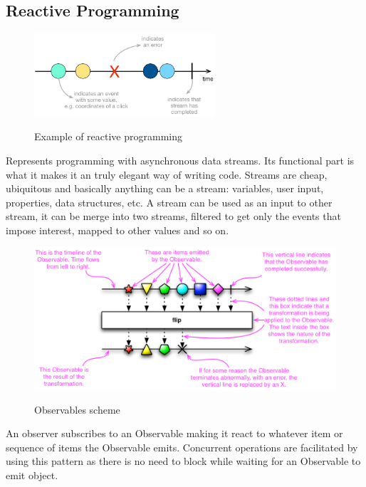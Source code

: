 \documentclass[12 pct]{report}
\begin{document}
\subsection*{Reactive Programming}

\begin{figure}[H]
\includegraphics[width=0.6\textwidth]{streams}
\centering
\label{fig:reactive-pgrogramming}
\caption{Example of reactive programming }
\end{figure}

Represents programming with asynchronous data streams. Its functional part is what it makes it an truly elegant way of writing code. Streams are cheap, ubiquitous and basically anything can be a stream: variables, user input, properties, data structures, etc. A stream can be used as an input to other stream, it can be merge into two streams, filtered to get only the events that impose interest, mapped to other  values and so on.

\begin{figure}[H]
\includegraphics[width=1.0\textwidth]{observable-doc}
\centering
\label{fig:feature-points}
\caption{ Observables scheme \cite{reactivexDocumentation} }
\end{figure}


An observer subscribes to an Observable making it react to whatever item or sequence of items the Observable emits. Concurrent operations are facilitated by using this pattern as there is no need to block while waiting for an Observable to emit object.
\end{document}
